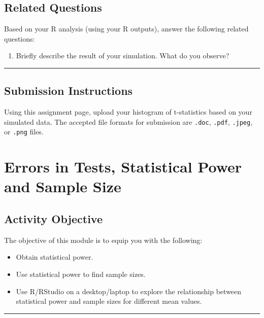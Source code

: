 \documentclass[oneside,openany]{book}
\providecommand{\tightlist}{%
  \setlength{\itemsep}{0pt}\setlength{\parskip}{0pt}}
\begin{document}
\section{Related Questions}\label{related-questions-5}

Based on your R analysis (using your R outputs), answer the following related questions:

\begin{enumerate}
\def\labelenumi{\arabic{enumi}.}
\tightlist
\item
  Briefly describe the result of your simulation. What do you observe?
\end{enumerate}

\begin{center}\rule{0.5\linewidth}{0.5pt}\end{center}

\section{Submission Instructions}\label{submission-instructions}

Using this assignment page, upload your histogram of t-statistics based on your simulated data. The accepted file formats for  submission are \texttt{.doc}, \texttt{.pdf}, \texttt{.jpeg}, or \texttt{.png} files.

\chapter{Errors in Tests, Statistical Power and Sample Size}\label{activity-7---errors-in-tests-statistical-power-and-sample-size}

\section{Activity Objective}\label{activity-objective-4}

The objective of this module is to equip you with the following:

\begin{itemize}
    \item Obtain statistical power.
    \item Use statistical power to find sample sizes.
    \item Use R/RStudio on a desktop/laptop to explore the relationship between statistical power and sample sizes for different mean values.
\end{itemize}


\begin{center}\rule{0.5\linewidth}{0.5pt}\end{center}
\end{document}
